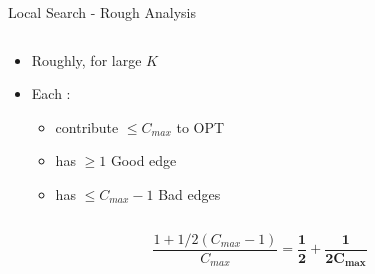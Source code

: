 \begin{frame}{Local Search - Rough Analysis}
\begin{columns}
\begin{column}{.6\textwidth}

\begin{itemize}
	\item Roughly, for large $K$
	\item Each {\color{red}\faStar}:
	\begin{itemize}
	  \item contribute $\leq C_{max}$ to OPT
	  \item has $\geq 1$ Good edge
	  \item has $\leq C_{max} - 1$ Bad edges
	\end{itemize}
\end{itemize}
\end{column}
\begin{column}{.5\textwidth}

\end{column}
\end{columns}
\vfill
$$
\frac{1 + 1/2 (C_{max} - 1)}{C_{max}} 
=
\bm{\frac{1}{2} + \frac{1}{2 C_{max}}}
$$
\end{frame}